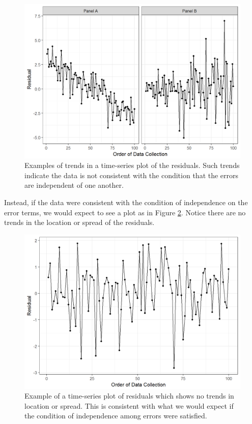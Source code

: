 \documentclass[]{book}
\theoremstyle{definition}
\theoremstyle{definition}
\theoremstyle{remark}
\begin{document}
\begin{figure}

{\centering \includegraphics[width=0.8\linewidth]{./Images/anovaassessment-independence-violations-1} 

}

\caption{Examples of trends in a time-series plot of the residuals.  Such trends indicate the data is not consistent with the condition that the errors are independent of one another.}\label{fig:anovaassessment-independence-violations}
\end{figure}

Instead, if the data were consistent with the condition of independence
on the error terms, we would expect to see a plot as in Figure
\ref{fig:anovaassessment-independence-reasonable}. Notice there are no
trends in the location or spread of the residuals.

\begin{figure}

{\centering \includegraphics[width=0.8\linewidth]{./Images/anovaassessment-independence-reasonable-1} 

}

\caption{Example of a time-series plot of residuals which shows no trends in location or spread.  This is consistent with what we would expect if the condition of independence among errors were satisfied.}\label{fig:anovaassessment-independence-reasonable}
\end{figure}
\end{document}
